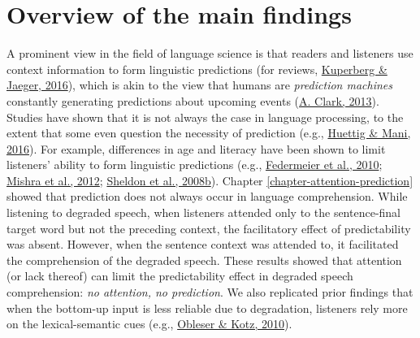 \documentclass[a4paper, nobind]{templates/ociamthesis}
\begin{document}
\hypertarget{overview-of-the-main-findings}{%
\section{Overview of the main findings}\label{overview-of-the-main-findings}}

A prominent view in the field of language science is that readers and listeners use context information to form linguistic predictions (for reviews, \protect\hyperlink{ref-Kuperberg2016}{Kuperberg \& Jaeger, 2016}),
which is akin to the view that humans are \emph{prediction machines} constantly generating predictions about upcoming events (\protect\hyperlink{ref-Clark2013}{A. Clark, 2013}).
Studies have shown that it is not always the case in language processing,
to the extent that some even question the necessity of prediction (e.g., \protect\hyperlink{ref-Huettig2016}{Huettig \& Mani, 2016}).
For example, differences in age and literacy have been shown to limit listeners' ability to form linguistic predictions (e.g., \protect\hyperlink{ref-Federmeier2010}{Federmeier et al., 2010}; \protect\hyperlink{ref-Mishra2012}{Mishra et al., 2012}; \protect\hyperlink{ref-Sheldon2008b}{Sheldon et al., 2008b}).
Chapter \ref{chapter-attention-prediction} showed that prediction does not always occur in language comprehension.
While listening to degraded speech, when listeners attended only to the sentence-final target word but not the preceding context, the facilitatory effect of predictability was absent.
However, when the sentence context was attended to, it facilitated the comprehension of the degraded speech.
These results showed that attention (or lack thereof) can limit the predictability effect in degraded speech comprehension: \emph{no attention, no prediction}.
We also replicated prior findings that when the bottom-up input is less reliable due to degradation,
listeners rely more on the lexical-semantic cues (e.g., \protect\hyperlink{ref-Obleser2010}{Obleser \& Kotz, 2010}).
\end{document}
